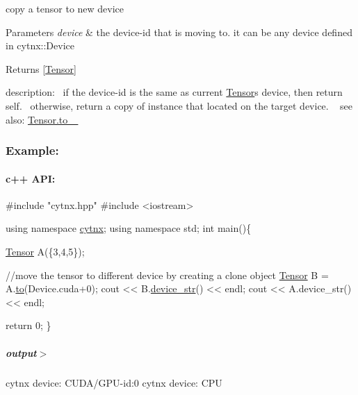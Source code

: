 copy a tensor to new device 


\begin{DoxyParams}{Parameters}
{\em device} & the device-\/id that is moving to. it can be any device defined in cytnx\+::\+Device \\
\hline
\end{DoxyParams}
\begin{DoxyReturn}{Returns}
\mbox{[}\hyperlink{classcytnx_1_1Tensor}{Tensor}\mbox{]}
\end{DoxyReturn}
description\+:~\newline
 if the device-\/id is the same as current \hyperlink{classcytnx_1_1Tensor}{Tensor}\textquotesingle{}s device, then return self.~\newline
 otherwise, return a copy of instance that located on the target device. ~\newline
 see also\+: \hyperlink{classcytnx_1_1Tensor_a114a31fbb8bf4a90f150b6a67e42183a}{Tensor.\+to\+\_\+ } ~\newline
 \subsubsection*{Example\+:}

\paragraph*{c++ A\+PI\+:}


\begin{DoxyCodeInclude}
\textcolor{preprocessor}{#include "cytnx.hpp"}
\textcolor{preprocessor}{#include <iostream>}


\textcolor{keyword}{using namespace }\hyperlink{namespacecytnx}{cytnx};
\textcolor{keyword}{using namespace }std;
\textcolor{keywordtype}{int} main()\{

    \hyperlink{classcytnx_1_1Tensor}{Tensor} A(\{3,4,5\});

    \textcolor{comment}{//move the tensor to different device by creating a clone object}
    \hyperlink{classcytnx_1_1Tensor}{Tensor} B = A.\hyperlink{classcytnx_1_1Tensor_acf7f697a9434f9bc98a7d00a555ee982}{to}(Device.cuda+0);
    cout << B.\hyperlink{classcytnx_1_1Tensor_a335f7625fa01784f49b2223238d0c14e}{device\_str}() << endl;
    cout << A.device\_str() << endl;    


    \textcolor{keywordflow}{return} 0;
\}
\end{DoxyCodeInclude}
 \subparagraph*{output$>$}


\begin{DoxyVerbInclude}
cytnx device: CUDA/GPU-id:0
cytnx device: CPU
\end{DoxyVerbInclude}
